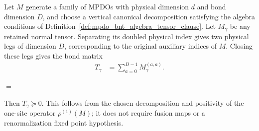 \begin{lemma}%
    \label{thm:mpdo_algebra_clause_terminal_transfer_positivity}
    \leanok
    Let $M$ generate a family of MPDOs with physical dimension $d$
    and bond dimension $D$, and choose a vertical canonical decomposition
    satisfying the algebra conditions of
    Definition~\ref{def:mpdo_bnt_algebra_tensor_clause}.
    Let $M_\gamma$ be any retained normal tensor. Separating its
    doubled physical index gives two physical legs of dimension $D$,
    corresponding to the original auxiliary indices of $M$.
    Closing these legs gives the bond matrix
    \begin{align}
        T_\gamma
         & =\sum_{a=0}^{D-1}M_\gamma^{(a,a)}.
        \label{eq:rfp_algebra_terminal_transfer}
    \end{align}
    \begin{center}
        \tenkzkernel
        \begin{tenkz}[rows={wire}, cols=1, west=open, east=open]
        \end{tenkz}
        $ = $
        \begin{tenkz}[rows={wire}, cols=1, west=open, east=open,
                trace=physical, physical=updown]
        \end{tenkz}
    \end{center}
    Then $T_\gamma\succeq0$. This follows from the chosen decomposition
    and positivity of the one-site operator $\rho^{(1)}(M)$; it does
    not require fusion maps or a renormalization fixed point hypothesis.
\end{lemma}

